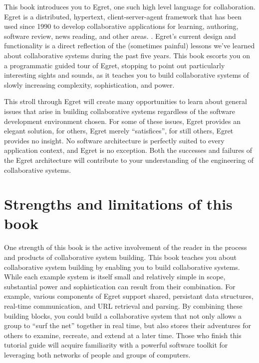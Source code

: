 This book
introduces you to Egret, one such high level language for
collaboration. Egret is a distributed, hypertext, client-server-agent
framework that has been used since 1990 to develop collaborative applications
for learning, authoring, software review, news reading, and other areas.
.  Egret's
current design and functionality is a direct reflection of the (sometimes
painful) lessons we've learned about collaborative systems during the
past five years. This book escorts you on a programmatic
guided tour of Egret, stopping to point out particularly interesting sights
and sounds, as it teaches you to build collaborative systems of slowly
increasing complexity, sophistication, and power.

This stroll through Egret will create many opportunities to learn about
general issues that arise in building collaborative systems regardless of
the software development environment chosen.  For some of these issues,
Egret provides an elegant solution, for others, Egret merely
``satisfices'', for still others, Egret provides no insight.  No software
architecture is perfectly suited to every application context, and Egret is
no exception.  Both the successes and failures of the Egret architecture
will contribute to your understanding of the engineering of collaborative
systems.


\section{Strengths and limitations of this book}

One strength of this book is the active involvement of the reader in the
process and products of collaborative system building.  This book teaches
you about collaborative system building by enabling you to build
collaborative systems. While each example system is itself small and
relatively simple in scope, substantial power and sophistication can result
from their combination.  For example, various components of Egret support
shared, persistant data structures, real-time communication, and URL
retrieval and parsing.  By combining these building blocks, you could build
a collaborative system that not only allows a group to ``surf the net''
together in real time, but also stores their adventures for others to
examine, recreate, and extend at a later time.  Those who finish this
tutorial guide will acquire familiarity with a powerful software
toolkit for leveraging both networks of people and groups of computers.

